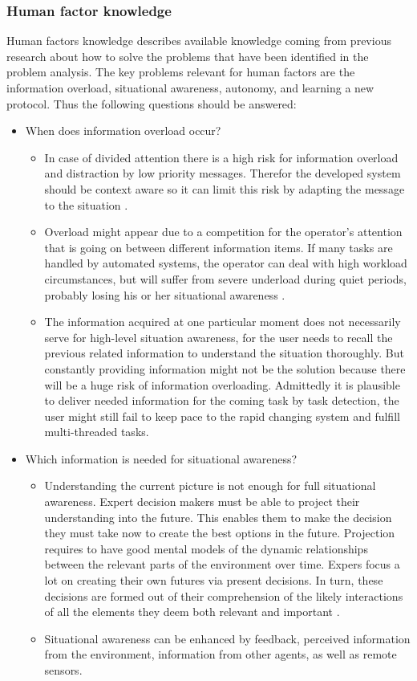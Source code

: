 \subsubsection{Human factor knowledge}
Human factors knowledge describes available knowledge coming from previous research about how to solve the problems that have been identified in the problem analysis. The key problems relevant for human factors are the information overload, situational awareness, autonomy, and learning a new protocol. Thus the following questions should be answered:
\begin{itemize}
	\item When does information overload occur?
	\begin{itemize}
		\item In case of divided attention there is a high risk for information overload and distraction by low priority messages. Therefor the developed system should be context aware so it can limit this risk by adapting the message to the situation \cite{Arimura2001}.
		\item Overload might appear due to a competition for the operator’s attention that is going on between different information items. If many tasks are handled by automated systems, the operator can deal with high workload circumstances, but will suffer from severe underload during quiet periods, probably losing his or her situational awareness \cite{Neerincx2008}.
		\item The information acquired at one particular moment does not necessarily serve for high-level situation awareness, for the user needs to recall the previous related information to understand the situation thoroughly. But constantly providing information might not be the solution because there will be a huge risk of information overloading. Admittedly it is plausible to deliver needed information for the coming task by task detection, the user might still fail to keep pace to the rapid changing system and fulfill multi-threaded tasks\cite{Porathe2014}.
	\end{itemize}
	
	\item Which information is needed for situational awareness?
	\begin{itemize}
		\item Understanding the current picture is not enough for full situational awareness. Expert decision makers must be able to project their understanding into the future. This enables them to make the decision they must take now to create the best options in the future. Projection requires to have good mental models of the dynamic relationships between the relevant parts of the environment over time. Expers focus a lot on creating their own futures via present decisions. In turn, these decisions are formed out of their comprehension of the likely interactions of all the elements they deem both relevant and important \cite{Gregory2010}.
		\item Situational awareness can be enhanced by feedback, perceived information from the environment, information from other agents, as well as remote sensors. \cite{Carver2007}
	\end{itemize}
	

\end{itemize}
